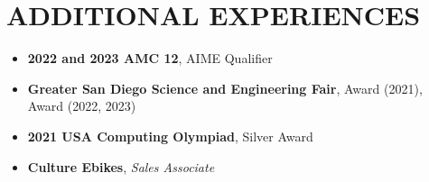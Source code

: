 \section*{ADDITIONAL EXPERIENCES}

\noindent
\begin{itemize}
	\item \textbf{2022 and 2023 AMC 12}, AIME Qualifier
	\item \textbf{Greater San Diego Science and Engineering Fair},  Award (2021),  Award (2022, 2023)
	\item \textbf{2021 USA Computing Olympiad}, Silver Award
	\item \textbf{Culture Ebikes}, \textit{Sales Associate}
\end{itemize}
